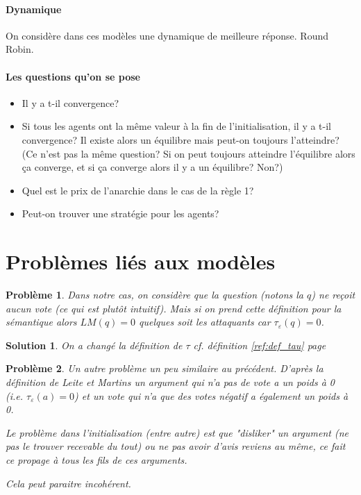 \documentclass[12pt]{article}
\theoremstyle{defi}
\theoremstyle{not}
\theoremstyle{prob}
\newtheorem{problem}{Problème}[section]
\newtheorem{solution}{Solution}[problem]
\begin{document}
    \paragraph{Dynamique\\}
      On considère dans ces modèles une dynamique de meilleure réponse. Round Robin.

    \paragraph{Les questions qu'on se pose}
    \begin{itemize}
      \item Il y a t-il convergence?
      \item Si tous les agents ont la même valeur à la fin de l'initialisation, il y a t-il convergence? Il existe alors un équilibre mais peut-on toujours l'atteindre? (Ce n'est pas la même question? Si on peut toujours atteindre l'équilibre alors ça converge, et si ça converge alors il y a un équilibre? Non?)
      \item Quel est le prix de l'anarchie dans le cas de la règle 1?
      \item Peut-on trouver une stratégie pour les agents?
    \end{itemize}



\section{Problèmes liés aux modèles}
\begin{problem}
  Dans notre cas, on considère que la question (notons la $q$) ne reçoit aucun vote (ce qui est plutôt intuitif). Mais si on prend cette définition pour la sémantique alors $LM(q) = 0$ quelques soit les attaquants car $\tau_\varepsilon(q) = 0$.
\end{problem}

\begin{solution}
    On a changé la définition de $\tau$ cf. définition \ref{ref:def_tau} page \pageref{ref:def_tau}
\end{solution}

\begin{problem}
    Un autre problème un peu similaire au précédent. D'après la définition de Leite et Martins un argument qui n'a pas de vote a un poids à 0 (i.e. $\tau_\varepsilon (a) = 0$) et un vote qui n'a que des votes négatif a également un poids à 0.

    Le problème dans l'initialisation (entre autre) est que "disliker" un argument (ne pas le trouver recevable du tout) ou ne pas avoir d'avis reviens au même, ce fait ce propage à tous les fils de ces arguments.

    Cela peut paraitre incohérent.
\end{problem}
\end{document}
